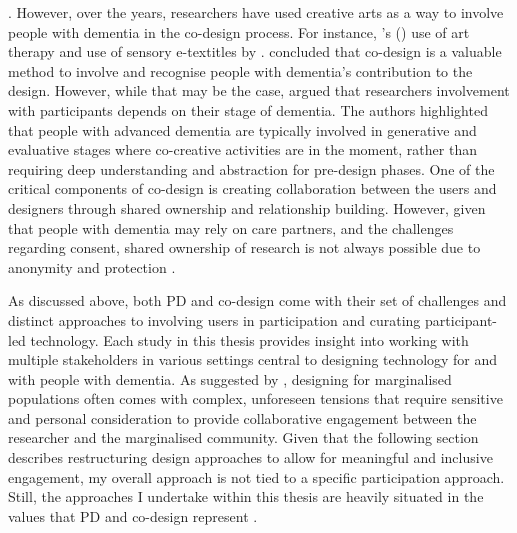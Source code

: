  \citep{bell2019collaborative}. However, over the years, researchers have used creative arts as a way to involve people with dementia in the co-design process. For instance, \citeauthor{lazar2018making}'s (\citeyear{lazar2018making}) use of art therapy and use of sensory e-textitles by \cite{treadaway_sensor_2016}. \cite{treadaway_sensor_2016} concluded that co-design is a valuable method to involve and recognise people with dementia's contribution to the design. However, while that may be the case, \cite{tsekleves2020engaging} argued that researchers involvement with participants depends on their stage of dementia. The authors highlighted that people with advanced dementia are typically involved in generative and evaluative stages where co-creative activities are in the moment, rather than requiring deep understanding and abstraction for pre-design phases. One of the critical components of co-design is creating collaboration between the users and designers through shared ownership and relationship building. However, given that people with dementia may rely on care partners, and the challenges regarding consent, shared ownership of research is not always possible due to anonymity and protection \citep{dewing_participatory_2007}. 

As discussed above, both PD and co-design come with their set of challenges and distinct approaches to involving users in participation and curating participant-led technology. Each study in this thesis provides insight into working with multiple stakeholders in various settings central to designing technology for and with people with dementia. As suggested by \cite{harrington_deconstructing_2019}, designing for marginalised populations often comes with complex, unforeseen tensions that require sensitive and personal consideration to provide collaborative engagement between the researcher and the marginalised community. Given that the following section describes restructuring design approaches to allow for meaningful and inclusive engagement, my overall approach is not tied to a specific participation approach. Still, the approaches I undertake within this thesis are heavily situated in the values that PD and co-design represent \citep{hansen2019participatory}.


